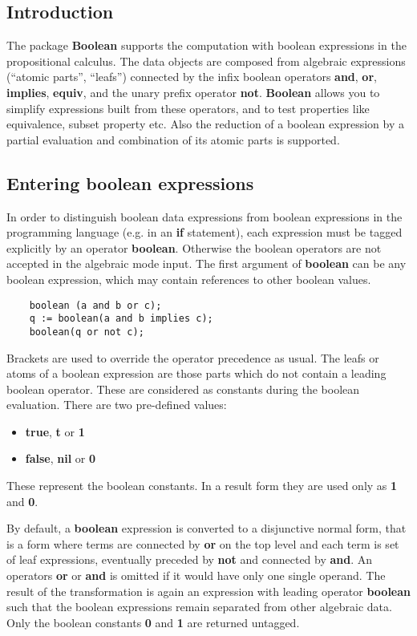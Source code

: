 
\subsection{Introduction}

The package {\bf Boolean} supports the computation with
boolean expressions in the propositional calculus.
The data objects are composed from algebraic expressions (``atomic parts'', ``leafs'')
connected by the infix boolean operators {\bf and}, {\bf or}, 
{\bf implies}, {\bf equiv}, and the unary prefix operator
{\bf not}. {\bf Boolean} allows you to simplify expressions
built from these operators, and to test properties like
equivalence, subset property etc. Also the reduction of
a boolean expression by a partial evaluation and combination
of its atomic parts is supported.

\subsection{Entering boolean expressions}

In order to distinguish boolean data expressions from 
boolean expressions in the \REDUCE programming
language (e.g. in an {\bf if} statement), each expression
must be tagged explicitly by an operator {\bf boolean}.
Otherwise the boolean operators are not accepted in the
\REDUCE  algebraic mode input.
The first argument of {\bf boolean} can be any boolean expression,
which may contain references to other boolean values.
\begin{verbatim}
    boolean (a and b or c);
    q := boolean(a and b implies c);
    boolean(q or not c);
\end{verbatim}
Brackets are used to override the operator precedence as usual.
The leafs or atoms of a boolean expression are those parts which
do not contain a leading boolean operator. These are
considered as constants during the boolean evaluation. There
are two pre-defined values:
\begin{itemize}
\item {\bf true}, {\bf t} or {\bf 1}
\item {\bf false}, {\bf nil} or {\bf 0}
\end{itemize}
These represent the boolean constants. In a result
form they are used only as {\bf 1} and {\bf 0}.

By default, a {\bf boolean} expression is converted  to a
disjunctive normal form, that is a form where terms are connected
by {\bf or} on the top level and each term is set of leaf
expressions, eventually preceded by {\bf not} and connected
by  {\bf and}. An operators {\bf or} or {\bf and} is omitted
if it would have only one single operand. The result of
the transformation is again an expression with leading 
operator {\bf boolean} such that the boolean expressions
remain separated from other algebraic data. Only the boolean
constants {\bf 0} and {\bf 1} are returned untagged.

